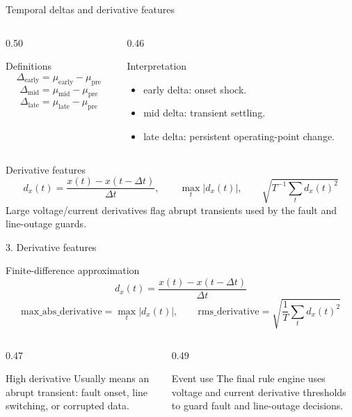 ﻿\documentclass[10pt,aspectratio=169]{beamer}
\begin{document}
\fi
\begin{frame}{Temporal deltas and derivative features}
\small
\begin{columns}[T,totalwidth=\textwidth]
\begin{column}{0.50\textwidth}
\begin{block}{Definitions}
\[
\Delta_{\mathrm{early}}=\mu_{\mathrm{early}}-\mu_{\mathrm{pre}}
\]
\[
\Delta_{\mathrm{mid}}=\mu_{\mathrm{mid}}-\mu_{\mathrm{pre}}
\]
\[
\Delta_{\mathrm{late}}=\mu_{\mathrm{late}}-\mu_{\mathrm{pre}}
\]
\end{block}
\end{column}
\begin{column}{0.46\textwidth}
\begin{exampleblock}{Interpretation}
\begin{itemize}
  \item early delta: onset shock.
  \item mid delta: transient settling.
  \item late delta: persistent operating-point change.
\end{itemize}
\end{exampleblock}
\end{column}
\end{columns}
\vspace{2mm}
\begin{alertblock}{Derivative features}
\[
d_x(t)=\frac{x(t)-x(t-\Delta t)}{\Delta t},\qquad
\max_t |d_x(t)|,\qquad
\sqrt{T^{-1}\sum_t d_x(t)^2}
\]
Large voltage/current derivatives flag abrupt transients used by the fault and line-outage guards.
\end{alertblock}
\end{frame}

\iffalse
\begin{frame}{3. Derivative features}
\small
\begin{block}{Finite-difference approximation}
\[
d_x(t) = \frac{x(t)-x(t-\Delta t)}{\Delta t}
\]
\[
\mathrm{max\_abs\_derivative}=\max_t |d_x(t)|,\qquad
\mathrm{rms\_derivative}=\sqrt{\frac{1}{T}\sum_t d_x(t)^2}
\]
\end{block}
\begin{columns}[T,totalwidth=\textwidth]
\begin{column}{0.47\textwidth}
\begin{exampleblock}{High derivative}
Usually means an abrupt transient: fault onset, line switching, or corrupted data.
\end{exampleblock}
\end{column}
\begin{column}{0.49\textwidth}
\begin{alertblock}{Event use}
The final rule engine uses voltage and current derivative thresholds to guard fault and line-outage decisions.
\end{alertblock}
\end{column}
\end{columns}
\end{frame}
\end{document}
